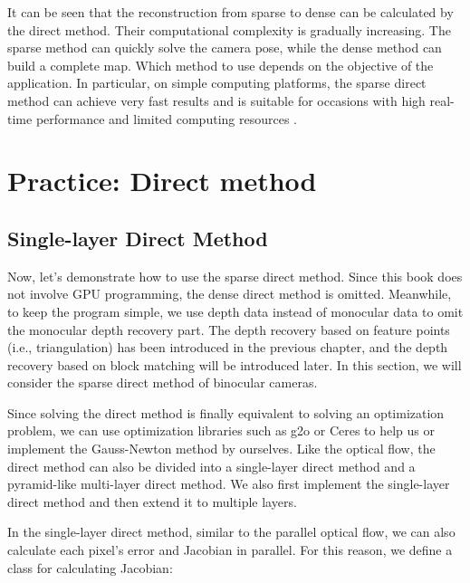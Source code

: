 It can be seen that the reconstruction from sparse to dense can be calculated by the direct method. Their computational complexity is gradually increasing. The sparse method can quickly solve the camera pose, while the dense method can build a complete map. Which method to use depends on the objective of the application. In particular, on simple computing platforms, the sparse direct method can achieve very fast results and is suitable for occasions with high real-time performance and limited computing resources {\cite{Engel2016}}.

\section{Practice: Direct method}
\subsection{Single-layer Direct Method}
Now, let's demonstrate how to use the sparse direct method. Since this book does not involve GPU programming, the dense direct method is omitted. Meanwhile, to keep the program simple, we use depth data instead of monocular data to omit the monocular depth recovery part. The depth recovery based on feature points (i.e., triangulation) has been introduced in the previous chapter, and the depth recovery based on block matching will be introduced later. In this section, we will consider the sparse direct method of binocular cameras.

Since solving the direct method is finally equivalent to solving an optimization problem, we can use optimization libraries such as g2o or Ceres to help us or implement the Gauss-Newton method by ourselves. Like the optical flow, the direct method can also be divided into a single-layer direct method and a pyramid-like multi-layer direct method. We also first implement the single-layer direct method and then extend it to multiple layers.

In the single-layer direct method, similar to the parallel optical flow, we can also calculate each pixel's error and Jacobian in parallel. For this reason, we define a class for calculating Jacobian:

